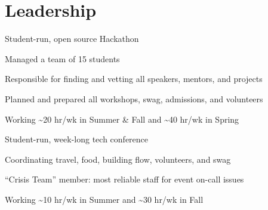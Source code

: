 \documentclass[]{deedy-resume-openfont}
\begin{document}
\begin{minipage}[t]{0.66\textwidth}




\vspace{8pt}

\section{Leadership}
\begin{tightemize}
\item Student-run, open source Hackathon
\item Managed a team of 15 students
\item Responsible for finding and vetting all speakers, mentors, and projects
\item Planned and prepared all workshops, swag, admissions, and volunteers
\item Working \textasciitilde20 hr/wk in Summer \& Fall and \textasciitilde40 hr/wk in Spring
\end{tightemize}
\sectionsep

\begin{tightemize}
\item Student-run, week-long tech conference
\item Coordinating travel, food, building flow, volunteers, and swag
\item ``Crisis Team'' member: most reliable staff for event on-call issues
\item Working \textasciitilde10 hr/wk in Summer and \textasciitilde30 hr/wk in Fall
\end{tightemize}

\end{minipage}
\end{document}
